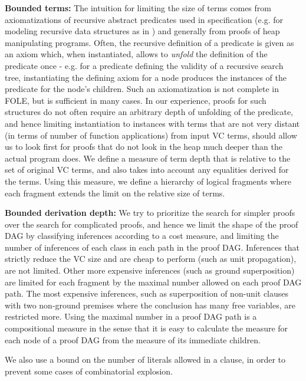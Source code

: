 \textbf{Bounded terms:}
The intuition for limiting the size of terms comes from axiomatizations of recursive abstract predicates used in specification (e.g. for modeling recursive data structures as in \cite{DBLP:conf/ecoop/HeuleKMS13}) and generally from proofs of heap manipulating programs. Often, the recursive definition of a predicate is given as an axiom which, when instantiated, allows to \emph{unfold} the definition of the predicate once - e.g. for a predicate defining the validity of a recursive search tree, instantiating the defining axiom for a node produces the instances of the predicate for the node's children. Such an axiomatization is not complete in FOLE, but is sufficient in many cases. In our experience, proofs for such structures do not often require an arbitrary depth of unfolding of the predicate, and hence limiting instantiation to instances with terms that are not very distant (in terms of number of function applications) from input VC terms, should allow us to look first for proofs that do not look in the heap much deeper than the actual program does. 
We define a measure of term depth that is relative to the set of original VC terms, and also takes into account any equalities derived for the terms. Using this measure, we define a hierarchy of logical fragments where each fragment extends the limit on the relative size of terms.

\textbf{Bounded derivation depth:}
We try to prioritize the search for simpler proofs over the search for complicated proofs, and hence we limit the shape of the proof DAG by classifying inferences according to a cost measure, and limiting the number of inferences of each class in each path in the proof DAG. Inferences that strictly reduce the VC size and are cheap to perform (such as unit propagation), are not limited.
Other more expensive inferences (such as ground superposition) are limited for each fragment by the maximal number allowed on each proof DAG path. The most expensive inferences, such as superposition of non-unit clauses with two non-ground premises where the conclusion has many free variables, are restricted more. Using the maximal number in a proof DAG path is a compositional measure in the sense that it is easy to calculate the measure for each node of a proof DAG from the measure of its immediate children.

We also use a bound on the number of literals allowed in a clause, in order to prevent some cases of combinatorial explosion.